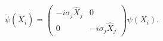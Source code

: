\begin{equation}
\label{trafo}
{\tilde \psi} \left({\tilde X_i}\right) =
\left(
  \begin{array}{cc}
     -i \sigma_j {\hat X}_j & 0 \\
     0 & -i \sigma_j {\hat X}_j 
  \end{array}
\right) 
\psi \left(X_i \right).
\end{equation}

